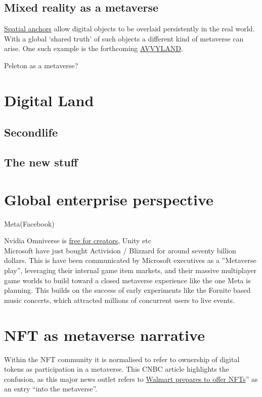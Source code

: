 \subsection{Mixed reality as a metaverse}
\href{https://docs.microsoft.com/en-us/windows/mixed-reality/design/spatial-anchors}{Spatial anchors} allow digital objects to be overlaid persistently in the real world. With a global `shared truth' of such objects a different kind of metaverse can arise.
One such example is the forthcoming \href{https://avvyland.com/}{AVVYLAND}.

Peleton as a metaverse?

\section{Digital Land}
\lipsum[50]
\subsection{Secondlife}
\lipsum[50]
\subsection{The new stuff}
\lipsum[50]
\section{Global enterprise perspective}
Meta(Facebook)

Nvidia Omniverse is \href{https://www.nvidia.com/en-us/omniverse/creators/}{free for creators}, Unity etc \\

Microsoft have just bought Activision / Blizzard for around seventy billion dollars. This is have been communicated by Microsoft executives as a ''Metaverse play'', leveraging their internal game item markets, and their massive multiplayer game worlds to build toward a closed metaverse experience like the one Meta is planning.
This builds on the success of early experiments like the Fornite based music concerts, which attracted millions of concurrent users to live events.

\section{NFT as metaverse narrative}
Within the NFT community it is normalised to refer to ownership of digital tokens as participation in a metaverse. 
This CNBC article highlights the confusion, as this major news outlet refers to \href{https://www.cnbc.com/2022/01/16/walmart-is-quietly-preparing-to-enter-the-metaverse.html}{Walmart prepares to offer NFTs}'' as an entry ``into the metaverse''.
\lipsum[50]
